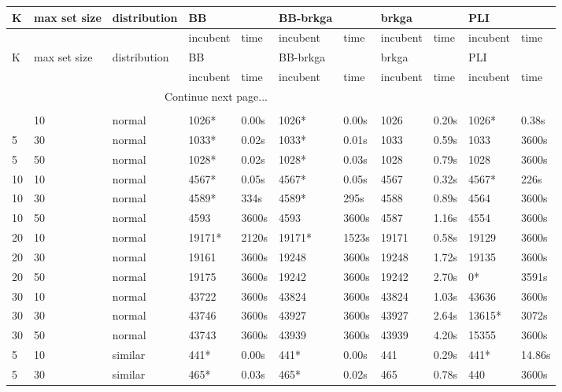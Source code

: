 \begin{scriptsize}
\setlength\LTleft{0pt}            %
\setlength\LTright{0pt}           %
\begin{longtable}{@{\extracolsep{\fill}}lllllllllll@{}}
\label{table:tests}\\
\hline
K & max set size & distribution & BB & & BB-brkga & & brkga & & PLI\\ 
\hline
& & & incubent & time & incubent & time & incubent & time & incubent & time\\ 
\hline
\endfirsthead
\hline
K & max set size & distribution & BB & & BB-brkga & & brkga & & PLI\\ 
\hline
& & & incubent & time & incubent & time & incubent & time & incubent & time\\ 
\hline
\endhead
\hline \multicolumn{5}{r}{{Continue next page...}} \\ 
\endfoot
\multicolumn{5}{r}{{}} \\ 
\endlastfoot
 5 & 10 & normal& 1026*& 0.00s& 1026*& 0.00s & 1026& 0.20s & 1026*& 0.38s \\
 5 & 30 & normal& 1033*& 0.02s& 1033*& 0.01s & 1033& 0.59s & 1033& 3600s\\
 5 & 50 & normal& 1028*& 0.02s& 1028*& 0.03s & 1028& 0.79s & 1028& 3600s\\
 10 & 10 & normal& 4567*& 0.05s& 4567*& 0.05s & 4567& 0.32s & 4567*& 226s \\
 10 & 30 & normal& 4589*& 334s & 4589*& 295s & 4588& 0.89s & 4564& 3600s\\
 10 & 50 & normal& 4593& 3600s& 4593& 3600s& 4587& 1.16s & 4554& 3600s\\
 20 & 10 & normal& 19171*& 2120s & 19171*& 1523s & 19171& 0.58s & 19129& 3600s\\
 20 & 30 & normal& 19161& 3600s& 19248& 3600s& 19248& 1.72s & 19135& 3600s\\
 20 & 50 & normal& 19175& 3600s& 19242& 3600s& 19242& 2.70s & 0*& 3591s \\
 30 & 10 & normal& 43722& 3600s& 43824& 3600s& 43824& 1.03s & 43636& 3600s\\
 30 & 30 & normal& 43746& 3600s& 43927& 3600s& 43927& 2.64s & 13615*& 3072s \\
 30 & 50 & normal& 43743& 3600s& 43939& 3600s& 43939& 4.20s & 15355& 3600s\\
 5 & 10 & similar& 441*& 0.00s& 441*& 0.00s & 441& 0.29s & 441*& 14.86s \\
 5 & 30 & similar& 465*& 0.03s& 465*& 0.02s & 465& 0.78s & 440& 3600s\\

\end{longtable}
\end{scriptsize}
